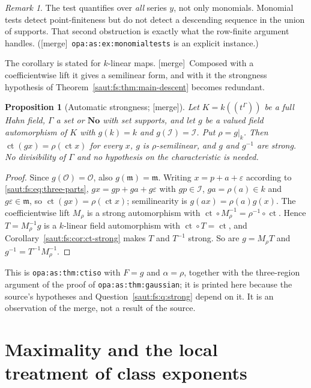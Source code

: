 \documentclass[11pt]{article}
\newtheorem{proposition}[theorem]{Proposition}
\theoremstyle{definition}
\theoremstyle{remark}
\newtheorem{remark}[theorem]{Remark}
\newcommand{\No}{\mathbf{No}}
\newcommand{\OO}{\mathcal O}
\newcommand{\mm}{\mathfrak m}
\newcommand{\lbl}[1]{\nolinkurl{#1}}%
\newcommand{\ct}{\operatorname{ct}}
\newcommand{\Ineg}{\mathcal I}
\newcommand{\mergetag}{\textup{[merge]}}
\numberwithin{equation}{section}
\begin{document}
\begin{remark}\label{saut:fs:rem:monomialtests}
The test quantifies over \emph{all} series $y$, not only monomials. Monomial tests
detect point-finiteness but do not detect a descending sequence in the union of
supports. That second obstruction is exactly what the row-finite argument handles.
(\mergetag\ \lbl{opa:as:ex:monomialtests} is an explicit instance.)
\end{remark}

The corollary is stated for $k$-linear maps. \mergetag\ Composed with a
coefficientwise lift it gives a semilinear form, and with it the strongness
hypothesis of Theorem~\ref{saut:fs:thm:main-descent} becomes redundant.

\begin{proposition}[Automatic strongness; \mergetag]\label{saut:fs:prop:autostrong}
Let $K=k((t^\Gamma))$ be a full Hahn field, $\Gamma$ a set or $\No$ with set supports,
and let $g$ be a valued field automorphism of $K$ with $g(k)=k$ and $g(\Ineg)=\Ineg$.
Put $\rho=g|_k$. Then $\ct(gx)=\rho(\ct x)$ for every $x$, $g$ is $\rho$-semilinear,
and $g$ and $g^{-1}$ are strong. No divisibility of $\Gamma$ and no hypothesis on the
characteristic is needed.
\end{proposition}
\begin{proof}
Since $g(\OO)=\OO$, also $g(\mm)=\mm$. Writing $x=p+a+\varepsilon$ according to
\eqref{saut:fs:eq:three-parts}, $gx=gp+ga+g\varepsilon$ with $gp\in\Ineg$,
$ga=\rho(a)\in k$ and $g\varepsilon\in\mm$, so $\ct(gx)=\rho(\ct x)$; semilinearity
is $g(ax)=\rho(a)g(x)$. The coefficientwise lift $M_{\rho}$ is a strong
automorphism with $\ct\circ M_\rho^{-1}=\rho^{-1}\circ\ct$. Hence $T=M_\rho^{-1}g$
is a $k$-linear field automorphism with $\ct\circ T=\ct$, and
Corollary~\ref{saut:fs:cor:ct-strong} makes $T$ and $T^{-1}$ strong. So are
$g=M_\rho T$ and $g^{-1}=T^{-1}M_\rho^{-1}$.
\end{proof}

This is \lbl{opa:as:thm:ctiso} with $F=g$ and $\alpha=\rho$, together with the
three-region argument of the proof of \lbl{opa:as:thm:gaussian}; it is printed here
because the source's hypotheses and Question~\ref{saut:fs:q:strong} depend on it.
It is an observation of the merge, not a result of the source.

\section{Maximality and the local treatment of class exponents}\label{saut:fs:sec:maximal}
\end{document}
